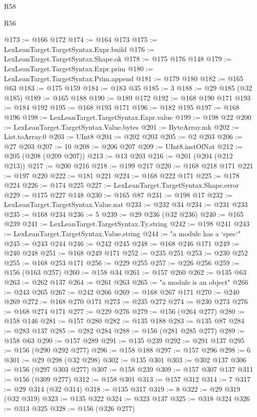 \begin{lexlean}{R58}
\begin{lexlean}{R56}
\begin{coremodule}
{{{{{{{{{{{{{{{{{{{{{{{{{{{{{{{{{{{{{{{{{{{{{{{{{{{{{{{{{{{{{{{{{{{{{{{{{{{{{{{{{{{{{{{{{{{{{{{{{{{{{{{{{{{{{{{{{{{{{{{{{{{{{{{{{{{{{{{{{{{{{{{{{{{{{{{{{{{{{{{{{{{{{{{{{{{{{{{{{{{{{{{{{{{{{{{{{{{{{{{{{{{{{{{{{{{@173 := @166 @172
@174 := @164 @173
@175 := LexLeanTarget.TargetSyntax.Expr.build
@176 := LexLeanTarget.TargetSyntax.Shape.ok
@178 := @175 @176 @148
@179 := LexLeanTarget.TargetSyntax.Expr.prim
@180 := LexLeanTarget.TargetSyntax.Prim.append
@181 := @179 @180
@182 := @165 @63
@183 := @175 @159
@184 := @183 @35
@185 := 3
@188 := @29 @185 (@32 @185)
@189 := @165 @188
@190 := @189 @172
@192 := @168 @190 @171
@193 := @184 @192
@195 := @168 @193 @171
@196 := @182 @195
@197 := @168 @196
@198 := LexLeanTarget.TargetSyntax.Expr.value
@199 := @198 @22
@200 := LexLeanTarget.TargetSyntax.Value.bytes
@201 := ByteArray.mk
@202 := List.toArray.{0}
@203 := UInt8
@204 := @202 @203
@205 := @2 @203
@206 := @27 @203
@207 := 10
@208 := @206 @207
@209 := UInt8.instOfNat
@212 := @205 (@208 (@209 @207))
@213 := @13 @203
@216 := @201 (@204 (@212 @213))
@217 := @200 @216
@218 := @199 @217
@220 := @168 @218 @171
@221 := @197 @220
@222 := @181 @221
@224 := @168 @222 @171
@225 := @178 @224
@226 := @174 @225
@227 := LexLeanTarget.TargetSyntax.Shape.error
@229 := @175 @227 @148
@230 := @165 @87
@231 := @198 @17
@232 := LexLeanTarget.TargetSyntax.Value.nat
@233 := @232 @34
@234 := @231 @233
@235 := @168 @234
@236 := 5
@239 := @29 @236 (@32 @236)
@240 := @165 @239
@241 := LexLeanTarget.TargetSyntax.Ty.string
@242 := @198 @241
@243 := LexLeanTarget.TargetSyntax.Value.string
@244 := "a module has a `spec`"
@245 := @243 @244
@246 := @242 @245
@248 := @168 @246 @171
@249 := @240 @248
@251 := @168 @249 @171
@252 := @235 @251
@253 := @230 @252
@255 := @168 @253 @171
@256 := @229 @255
@257 := @226 @256
@259 := @156 (@163 @257)
@260 := @158 @34
@261 := @157 @260
@262 := @135 @63
@263 := @262 @137
@264 := @261 @263
@265 := "a module is an object"
@266 := @243 @265
@267 := @242 @266
@269 := @168 @267 @171
@270 := @240 @269
@272 := @168 @270 @171
@273 := @235 @272
@274 := @230 @273
@276 := @168 @274 @171
@277 := @229 @276
@279 := @156 (@264 @277)
@280 := @158 @146
@281 := @157 @280
@282 := @135 @188
@283 := @135 @87
@284 := @283 @137
@285 := @282 @284
@288 := @156 (@281 @285 @277)
@289 := @158 @63
@290 := @157 @289
@291 := @135 @239
@292 := @291 @137
@295 := @156 (@290 @292 @277)
@296 := @158 @188
@297 := @157 @296
@298 := 6
@301 := @29 @298 (@32 @298)
@302 := @135 @301
@303 := @302 @137
@306 := @156 (@297 @303 @277)
@307 := @158 @239
@309 := @157 @307 @137
@311 := @156 (@309 @277)
@312 := @158 @301
@313 := @157 @312
@314 := 7
@317 := @29 @314 (@32 @314)
@318 := @135 @317
@319 := 8
@322 := @29 @319 (@32 @319)
@323 := @135 @322
@324 := @323 @137
@325 := @318 @324
@326 := @313 @325
@328 := @156 (@326 @277)
}}}}}}}}}}}}}}}}}}}}}}}}}}}}}}}}}}}}}}}}}}}}}}}}}}}}}}}}}}}}}}}}}}}}}}}}}}}}}}}}}}}}}}}}}}}}}}}}}}}}}}}}}}}}}}}}}}}}}}}}}}}}}}}}}}}}}}}}}}}}}}}}}}}}}}}}}}}}}}}}}}}}}}}}}}}}}}}}}}}}}}}}}}}}}}}}}}}}}}}}}}}}}}}}}}}
\end{coremodule}
\end{lexlean}
\end{lexlean}
